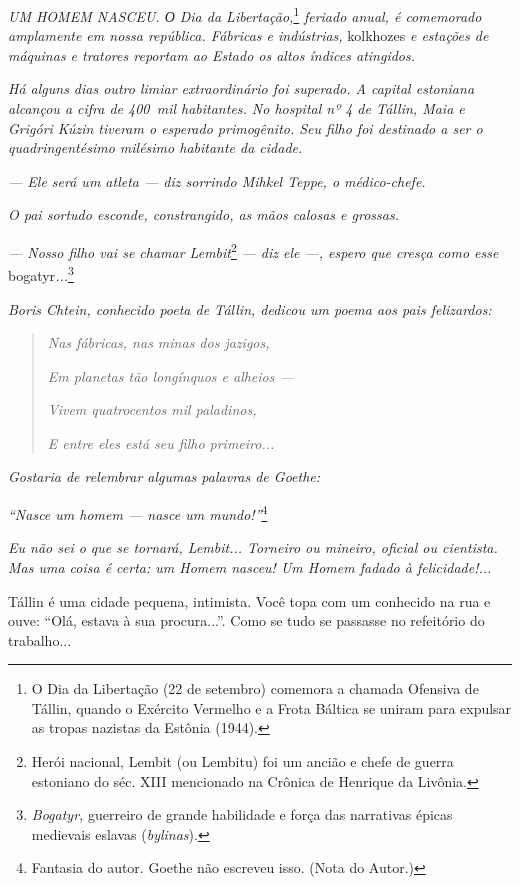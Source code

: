 \emph{UM HOMEM NASCEU. О Dia da Libertação,}\footnote{O Dia da
  Libertação (22 de setembro) comemora a chamada Ofensiva de Tállin,
  quando o Exército Vermelho e a Frota Báltica se uniram para expulsar
  as tropas nazistas da Estônia (1944).} \emph{feriado anual, é
comemorado amplamente em nossa república. Fábricas e indústrias,}
kolkhozes \emph{e estações de máquinas e tratores reportam ao Estado os
altos índices atingidos.}

\emph{Há alguns dias outro limiar extraordinário foi superado. A capital
estoniana alcançou a cifra de 400~mil habitantes. No hospital nº 4 de
Tállin, Maia e Grigóri Kúzin tiveram o esperado primogênito. Seu filho
foi destinado a ser o quadringentésimo milésimo habitante da cidade.}

\emph{--- Ele será um atleta --- diz sorrindo Mihkel Teppe, o
médico-chefe.}

\emph{O pai sortudo esconde, constrangido, as mãos calosas e grossas.}

\emph{--- Nosso filho vai se chamar Lembit}\footnote{Herói nacional,
  Lembit (ou Lembitu) foi um ancião e chefe de guerra estoniano do séc.
  XIII mencionado na Crônica de Henrique da Livônia.} \emph{--- diz ele
---, espero que cresça como esse} bogatyr\emph{...}\footnote{\emph{Bogatyr,}
  guerreiro de grande habilidade e força das narrativas épicas medievais
  eslavas (\emph{bylinas}).}

\emph{Boris Chtein, conhecido poeta de Tállin, dedicou um poema aos pais
felizardos:}

\begin{quote}
\emph{Nas fábricas, nas minas dos jazigos,}

\emph{Em planetas tão longínquos e alheios ---}

\emph{Vivem quatrocentos mil paladinos,}

\emph{E entre eles está seu filho primeiro...}
\end{quote}

\emph{Gostaria de relembrar algumas palavras de Goethe:}

\emph{``Nasce um homem --- nasce um mundo!''}\footnote{Fantasia do
  autor. Goethe não escreveu isso. (Nota do Autor.)}

\emph{Eu não sei o que se tornará, Lembit... Torneiro ou mineiro,
oficial ou cientista. Mas uma coisa é certa: um Homem nasceu! Um Homem
fadado à felicidade!...}

Tállin é uma cidade pequena, intimista. Você topa com um conhecido na
rua e ouve: ``Olá, estava à sua procura...''. Como se tudo se passasse
no refeitório do trabalho...

